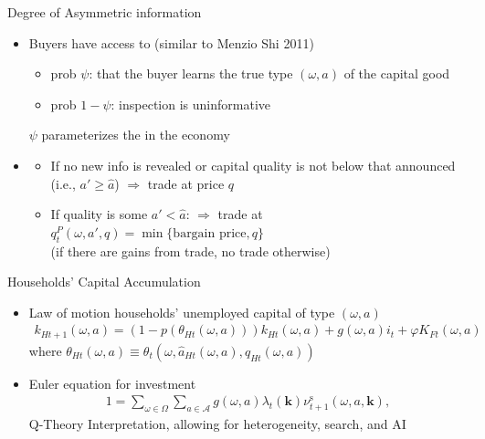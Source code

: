 \documentclass[english,xcolor=svgnames,aspectratio=169]{beamer}
\newcommand{\Seller}{^\mathrm{s}}
\begin{document}
\begin{frame}{Degree of Asymmetric information}\label{main:insp_protocol}

\begin{itemize}

\item Buyers have access to {\color{dblue}{\bf inspection technology}} {\scriptsize{(similar to Menzio Shi 2011)}} \smallskip
\begin{itemize}
\item prob $\psi$: that the buyer learns the true type $(\omega, a)$ of the capital good \smallskip
\item prob $1-\psi$: inspection is uninformative \smallskip
\end{itemize}
$\psi$ parameterizes the {\color{dred}{degree of asymmetric information}} in the economy
\bigskip
\item {\color{dblue}{\bf Trading protocol upon inspection}} \smallskip
\begin{itemize}
\item If no new info is revealed or capital quality is not below that announced (i.e., $a'\geq \hat a$) $\Rightarrow$ trade at price $q$  \medskip
\item If quality is some $a'<\hat a$: $\Rightarrow$ trade at $q^P_{t}(\omega,a',q)=\min\{\text{bargain price}, q\}$ \\(if there are gains from trade, no trade otherwise) 
\end{itemize}


\end{itemize}


\end{frame}

\begin{frame}{Households' Capital Accumulation}

\bigskip
\begin{itemize}

\item Law of motion households' {\color{dblue}unemployed capital} of type $(\omega,a)$
\begin{align*}
k_{Ht+1}(\omega,a) =(1-p(\theta _{Ht} (\omega,a)))k_{Ht}(\omega,a)+g(\omega,a)i_{t}+\varphi K_{Ft}(\omega,a)
\end{align*}
\medskip
{\scriptsize{where $\theta _{Ht}(\omega,a)\equiv \theta _{t} (\omega,\hat{a}_{Ht}(\omega, a), {q}_{Ht}(\omega, a))$}}

\bigskip 

\item Euler equation for {\color{dblue} investment}
\begin{align*}
1={\sum_{\omega  \in \Omega }} {\sum_{ a  \in \mathcal A}}  g(\omega, a)\lambda_{t}({\mathbf{k}})\nu\Seller_{t+1}(\omega,a,\mathbf{k}),
\end{align*}
Q-Theory Interpretation, allowing for heterogeneity, search, and AI
\end{itemize}
\medskip

\end{frame}
\end{document}

